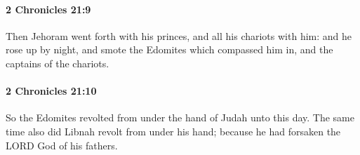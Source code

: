 		\paragraph{2 Chronicles 21:9} %
			\label{2CHRONICLES-21-9}

			Then Jehoram went forth with his princes, and all his chariots with him: and he rose up by night, and smote the Edomites which compassed him in, and the captains of the chariots.


		\paragraph{2 Chronicles 21:10} %
			\label{2CHRONICLES-21-10}

			So the Edomites revolted from under the hand of Judah unto this day. The same time also did Libnah revolt from under his hand; because he had forsaken the LORD God of his fathers.


